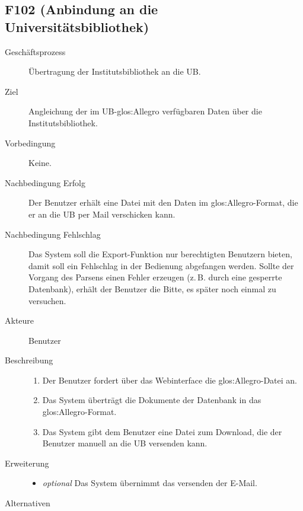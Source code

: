 \subsection{F102 (Anbindung an die Universitätsbibliothek)}
\begin{description}
  \item[Geschäftsprozess]Übertragung der Institutsbibliothek an die \gls{UB}.
  \item[Ziel]Angleichung der im \gls{UB}-\gls{glos:Allegro} verfügbaren Daten über die Institutsbibliothek.
  \item[Vorbedingung]Keine.
  \item[Nachbedingung Erfolg]Der Benutzer erhält eine Datei mit den Daten im \gls{glos:Allegro}-Format, die er an die \gls{UB} per Mail verschicken kann.
  \item[Nachbedingung Fehlschlag]Das System soll die Export-Funktion nur berechtigten Benutzern bieten, damit soll ein Fehlschlag in der Bedienung abgefangen werden. Sollte der Vorgang des Parsens einen Fehler erzeugen (z.\,B. durch eine gesperrte Datenbank), erhält der Benutzer die Bitte, es später noch einmal zu versuchen.
  \item[Akteure]Benutzer
  \item[Beschreibung]\hfill
    \begin{enumerate}
      \item Der Benutzer fordert über das Webinterface die \gls{glos:Allegro}-Datei an.
      \item Das System überträgt die Dokumente der Datenbank in das \gls{glos:Allegro}-Format.
      \item Das System gibt dem Benutzer eine Datei zum Download, die der Benutzer manuell an die \gls{UB} versenden kann.
    \end{enumerate}
  \item[Erweiterung]\hfill
    \begin{itemize}
      \item \emph{optional} Das System übernimmt das versenden der E-Mail.
    \end{itemize}
  \item[Alternativen]
\end{description}


